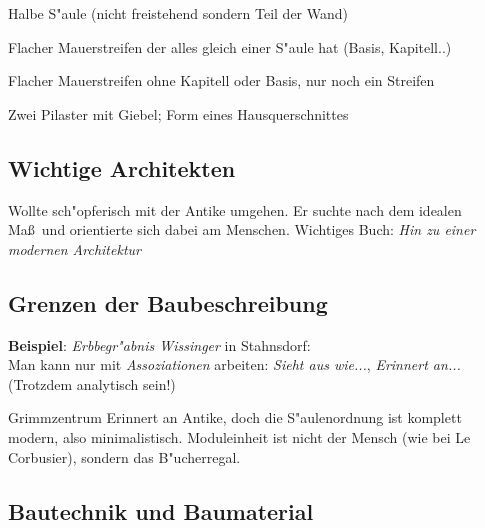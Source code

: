 \documentclass[]{scrartcl}
\begin{document}
\begin{description}[leftmargin=!,labelwidth=\widthof{\bfseries Halbs"aulenvorlage}]
  \item[Halbs"aulenvorlage] Halbe S"aule (nicht freistehend sondern Teil der Wand)
  \item[Pilaster] Flacher Mauerstreifen der alles gleich einer S"aule hat (Basis, Kapitell..)
  \item[Lisene] Flacher Mauerstreifen ohne Kapitell oder Basis, nur noch ein Streifen
  \item["Adikula] Zwei Pilaster mit Giebel; Form eines Hausquerschnittes
\end{description}

\subsection{Wichtige Architekten}


\begin{description}[leftmargin=!,labelwidth=\widthof{\bfseries Le Corbusie}]
  \item[Le Corbusier] Wollte sch"opferisch mit der Antike umgehen. Er suchte nach dem idealen Ma\ss~und orientierte sich dabei am Menschen. Wichtiges Buch: \emph{Hin zu einer modernen Architektur}
\end{description}

\subsection{Grenzen der Baubeschreibung}

\textbf{Beispiel}: \emph{Erbbegr"abnis Wissinger} in Stahnsdorf:\\ Man kann nur mit \emph{Assoziationen} arbeiten: \emph{Sieht aus wie...}, \emph{Erinnert an...} (Trotzdem analytisch sein!)

Grimmzentrum Erinnert an Antike, doch die S"aulenordnung ist komplett modern, also minimalistisch. Moduleinheit ist nicht der Mensch (wie bei Le Corbusier), sondern das B"ucherregal.

\subsection{Bautechnik und Baumaterial}
\end{document}

